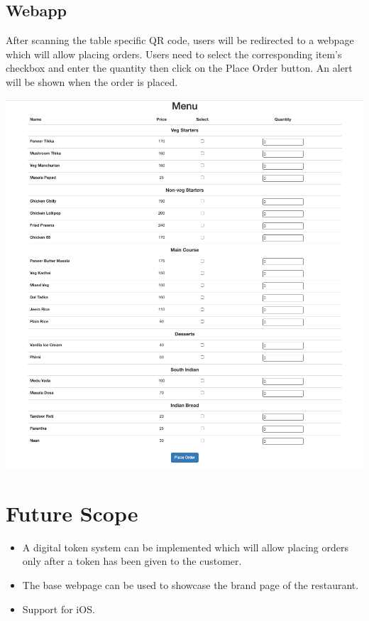 \documentclass{article}
\begin{document}
\subsection{Webapp}
After scanning the table specific QR code, users will be redirected to a webpage which will allow placing orders. Users need to select the corresponding item's checkbox and enter the quantity then click on the Place Order button. An alert will be shown when the order is placed.
\begin{center}
\includegraphics[scale=0.4]{webapp}
\end{center}

\newpage
\section{Future Scope}
\begin{itemize}
    \item{A digital token system can be implemented which will allow placing orders only after a token has been given to the customer.}
    
    \item{The base webpage can be used to showcase the brand page of the restaurant.}
    
    \item{Support for iOS. }

\end{itemize}
    
\end{document}
